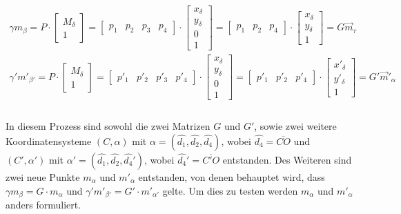 \begin{gather}
\gamma m_\beta = P \cdot 
\begin{bmatrix}
	M_\delta\\1
\end{bmatrix} = 
\begin{bmatrix}
	p_1&p_2&p_3&p_4
\end{bmatrix} \cdot
\begin{bmatrix}
	x_\delta\\y_\delta\\0\\1
\end{bmatrix}=
\begin{bmatrix}
	p_1&p_2&p_4
\end{bmatrix} \cdot
\begin{bmatrix}
	x_\delta\\y_\delta\\1
\end{bmatrix}=
G \vec{m}_\tau\\
\gamma' m'_{\beta'} = P \cdot 
\begin{bmatrix}
	M_\delta\\1
\end{bmatrix} = 
\begin{bmatrix}
	p'_1&p'_2&p'_3&p'_4
\end{bmatrix} \cdot
\begin{bmatrix}
	x_\delta\\y_\delta\\0\\1
\end{bmatrix}=
\begin{bmatrix}
	p'_1&p'_2&p'_4
\end{bmatrix} \cdot
\begin{bmatrix}
	x'_\delta\\y'_\delta\\1
\end{bmatrix}=
G' \vec{m}'_{\alpha}\\
\end{gather}\\

In diesem Prozess sind sowohl die zwei Matrizen $G$ und $G'$, sowie zwei weitere Koordinatensysteme $(C,\alpha)$ mit $\alpha = (\hat{d_1},\hat{d_2},\hat{d_4})$, wobei $\hat{d_4} = \overline{CO}$ und  $(C',\alpha')$ mit $\alpha' = (\hat{d_1},\hat{d_2},\hat{d_4}')$, wobei $\hat{d_4}' = \overline{C'O}$ entstanden\cite{Elements}.
Des Weiteren sind zwei neue Punkte $m_\alpha$ und $m'_{\alpha}$ entstanden, von denen behauptet wird, dass $\gamma m_\beta = G\cdot m_\alpha$ und $\gamma' m'_{\beta'} = G'\cdot m'_{\alpha'}$ gelte\cite{Elements}. Um dies zu testen werden $m_\alpha$ und $m'_{\alpha}$ anders formuliert.

